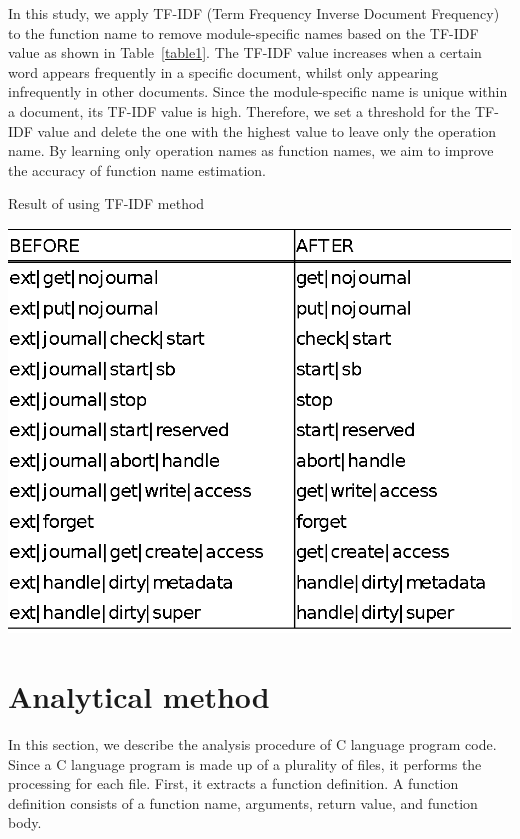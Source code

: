 \documentclass[JIP]{apris}
\begin{document}
In this study, we apply TF-IDF (Term Frequency Inverse Document Frequency)\cite{ramos2003using} to the function name to remove module-specific names based on the TF-IDF value as shown in Table~\ref{table1}. The TF-IDF value increases when a certain word appears frequently in a specific document, whilst only appearing infrequently in other documents. Since the module-specific name is unique within a document, its TF-IDF value is high. Therefore, we set a threshold for the TF-IDF value and delete the one with the highest value to leave only the operation name. By learning only operation names as function names, we aim to improve the accuracy of function name estimation. 
\begin{table}[t]
 \centering
 \caption{Result of using TF-IDF method}
 \includegraphics[width=1.0\hsize]{image/ITF-DFcompare.eps} 
 \label{table1} 
\end{table}


\section{Analytical method}
In this section, we describe the analysis procedure of C language program code.
Since a C language program is made up of a plurality of files, it performs the processing for each file. First, it extracts a function definition. A function definition consists of a function name, arguments, return value, and function body.
\end{document}
